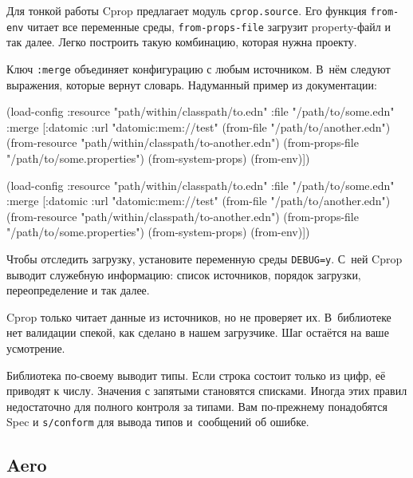 Для тонкой работы Cprop предлагает модуль \verb|cprop.source|. Его функция
\verb|from-env| читает все переменные среды, \verb|from-props-file| загрузит
property-файл и так далее. Легко построить такую комбинацию, которая нужна
проекту.

Ключ \verb|:merge| объединяет конфигурацию с любым источником. В~нём следуют
выражения, которые вернут словарь. Надуманный пример из документации:

\ifx\DEVICETYPE\MOBILE

\begin{english}
  \begin{clojure}
(load-config
 :resource "path/within/classpath/to.edn"
 :file "/path/to/some.edn"
 :merge
 [{:datomic {:url "datomic:mem://test"}}
  (from-file "/path/to/another.edn")
  (from-resource
  "path/within/classpath/to-another.edn")
  (from-props-file
   "/path/to/some.properties")
  (from-system-props)
  (from-env)])
  \end{clojure}
\end{english}

\else

\begin{english}
  \begin{clojure}
(load-config
 :resource "path/within/classpath/to.edn"
 :file "/path/to/some.edn"
 :merge [{:datomic {:url "datomic:mem://test"}}
         (from-file "/path/to/another.edn")
         (from-resource "path/within/classpath/to-another.edn")
         (from-props-file "/path/to/some.properties")
         (from-system-props)
         (from-env)])
  \end{clojure}
\end{english}

\fi

Чтобы отследить загрузку, установите переменную среды \verb|DEBUG=y|. С~ней
Cprop выводит служебную информацию: список источников, порядок загрузки,
переопределение и так далее.

Cprop только читает данные из источников, но не проверяет их. В~библиотеке нет
валидации спекой, как сделано в нашем загрузчике. Шаг остаётся на ваше
усмотрение.

Библиотека по-своему выводит типы. Если строка состоит только из цифр, её
приводят к числу. Значения с запятыми становятся списками. Иногда этих правил
недостаточно для полного контроля за типами. Вам по-прежнему понадобятся
Spec и \verb|s/conform| для вывода типов и~сообщений об ошибке.

\subsection{Aero}

